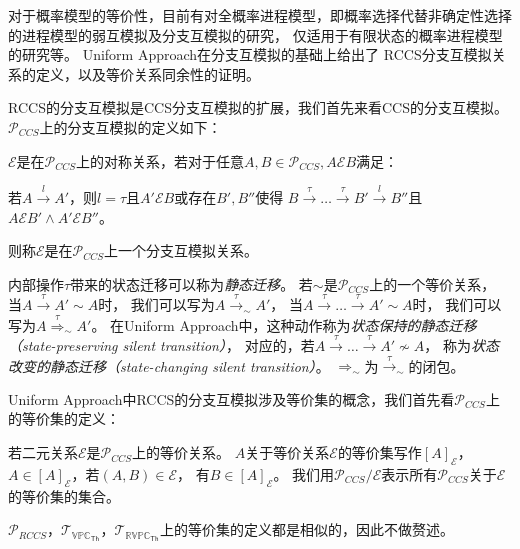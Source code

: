    对于概率模型的等价性，目前有对全概率进程模型，即概率选择代替非确定性选择的进程模型的弱互模拟及分支互模拟的研究\cite{全概率的弱互模拟和分支互模拟}，
   仅适用于有限状态的概率进程模型的研究\cite{有限状态_1,有限状态_2}等。
   Uniform Approach在分支互模拟\cite{Branching_1, Branching_2}的基础上给出了
   RCCS分支互模拟关系的定义，以及等价关系同余性的证明。
   
   RCCS的分支互模拟是CCS分支互模拟的扩展，我们首先来看CCS的分支互模拟。
   $\mathcal{P}_{CCS}$上的分支互模拟的定义如下：
   \begin{definition}\label{def:branching0}
      $\mathcal{E}$是在$\mathcal{P}_{CCS}$上的对称关系，若对于任意$A,B\in \mathcal{P}_{CCS},A\mathcal{E}B$满足：

            若$A\stackrel{l}{\rightarrow}A'$，则$l=\tau$且$A'\mathcal{E}B$或存在$B',B''$使得
            $B\stackrel{\tau}{\rightarrow}\dots\stackrel{\tau}{\rightarrow}B'\stackrel{l}{\rightarrow}B''$且$A\mathcal{E}B'\wedge A'\mathcal{E}B''$。

            则称$\mathcal{E}$是在$\mathcal{P}_{CCS}$上一个分支互模拟关系。
   \end{definition}
   
   内部操作$\tau$带来的状态迁移可以称为\textit{静态迁移}。
   若$\sim$是$\mathcal{P}_{CCS}$上的一个等价关系，
   当$A\stackrel{\tau}{\rightarrow}A'\sim A$时，
   我们可以写为$A\stackrel{\tau}{\rightarrow}_{\sim}A'$，
   当$A\stackrel{\tau}{\rightarrow}\dots \stackrel{\tau}{\rightarrow}A'\sim A$时，
   我们可以写为$A\stackrel{\tau}{\Rightarrow}_{\sim}A'$。
   在Uniform Approach中，这种动作称为\textit{状态保持的静态迁移（state-preserving silent transition）}，
   对应的，若$A\stackrel{\tau}{\rightarrow}\dots \stackrel{\tau}{\rightarrow}A'\not\sim A$，
   称为\textit{状态改变的静态迁移（state-changing silent transition）}。
   $\Rightarrow_{\sim}$为$\stackrel{\tau}{\rightarrow}_{\sim}$的闭包。

   Uniform Approach中RCCS的分支互模拟涉及等价集的概念，我们首先看$\mathcal{P}_{CCS}$上的等价集的定义：
   \begin{definition}
      若二元关系$\mathcal{E}$是$\mathcal{P}_{CCS}$上的等价关系。
      $A$关于等价关系$\mathcal{E}$的等价集写作$[A]_{\mathcal{E}}$，
      $A\in [A]_{\mathcal{E}}$，若$(A,B)\in \mathcal{E}$，
      有$B\in [A]_{\mathcal{E}}$。
      我们用$\mathcal{P}_{CCS}/\mathcal{E}$表示所有$\mathcal{P}_{CCS}$关于$\mathcal{E}$的等价集的集合。
   \end{definition}
   $\mathcal{P}_{RCCS}$，$\mathcal{T}_{\mathbb{VPC}_{\mathsf{Th}}}$，$\mathcal{T}_{\mathbb{RVPC}_{\mathsf{Th}}}$上的等价集的定义都是相似的，因此不做赘述。

